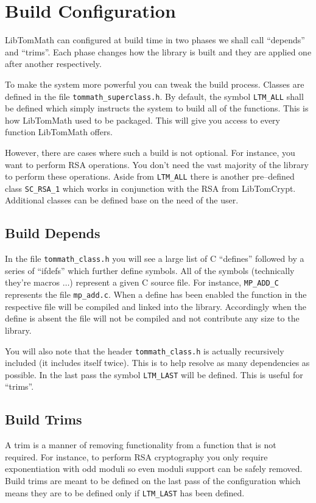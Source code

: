 \documentclass[synpaper]{book}
\begin{document}
\section{Build Configuration}
LibTomMath can configured at build time in two phases we shall call ``depends'' and
``trims''. Each phase changes how the library is built and they are applied one after another
respectively.

To make the system more powerful you can tweak the build process.  Classes are defined in the file
\texttt{tommath\_superclass.h}.  By default, the symbol \texttt{LTM\_ALL} shall be defined which
simply instructs the system to build all of the functions.  This is how LibTomMath used to be
packaged. This will give you access to every function LibTomMath offers.

However, there are cases where such a build is not optional.  For instance, you want to perform RSA
operations.  You don't need the vast majority of the library to perform these operations.  Aside
from \texttt{LTM\_ALL} there is another pre--defined class \texttt{SC\_RSA\_1} which works in
conjunction with the RSA from LibTomCrypt.  Additional classes can be defined base on the need of
the user.

\subsection{Build Depends}
In the file \texttt{tommath\_class.h} you will see a large list of C ``defines'' followed by a
series of ``ifdefs'' which further define symbols.  All of the symbols (technically they're macros
$\ldots$) represent a given C source file.  For instance, \texttt{MP\_ADD\_C} represents the file
\texttt{mp\_add.c}.  When a define has been enabled the function in the respective file will be
compiled and linked into the library.  Accordingly when the define is absent the file will not be
compiled and not contribute any size to the library.

You will also note that the header \texttt{tommath\_class.h} is actually recursively included (it
includes itself twice). This is to help resolve as many dependencies as possible.  In the last pass
the symbol \texttt{LTM\_LAST} will be defined. This is useful for ``trims''.

\subsection{Build Trims}
A trim is a manner of removing functionality from a function that is not required.  For instance,
to perform RSA cryptography you only require exponentiation with odd moduli so even moduli support
can be safely removed. Build trims are meant to be defined on the last pass of the configuration
which means they are to be defined only if \texttt{LTM\_LAST} has been defined.
\end{document}
